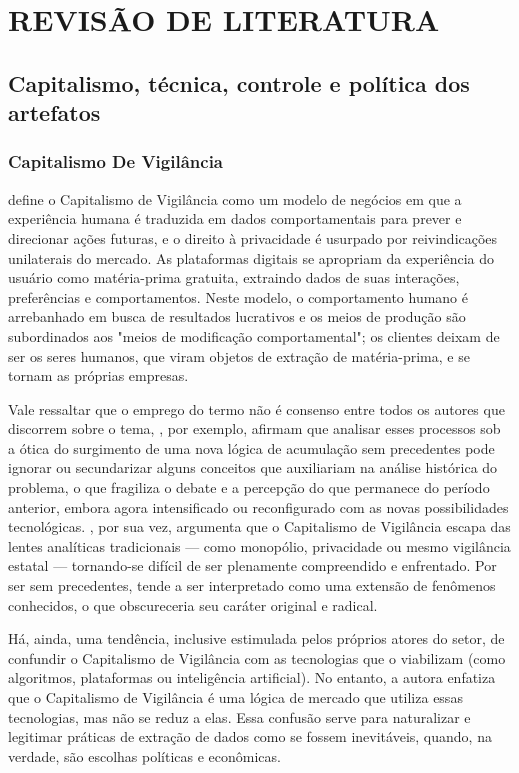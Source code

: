 \chapter{REVISÃO DE LITERATURA}
\label{chap:revisaodeliteratura} 

\section{Capitalismo, técnica, controle e política dos artefatos}
\label{sec:capitalismo-tecnica-controle}

\subsection{Capitalismo De Vigilância}
\label{subsec:capVigilancia}

 define o Capitalismo de Vigilância como um modelo de negócios em que a experiência humana é traduzida em dados comportamentais para prever e direcionar ações futuras, e o direito à privacidade é usurpado por reivindicações unilaterais do mercado. As plataformas digitais se apropriam da experiência do usuário como matéria-prima gratuita, extraindo dados de suas interações, preferências e comportamentos. Neste modelo, o comportamento humano é arrebanhado em busca de resultados lucrativos e os meios de produção são subordinados aos "meios de modificação comportamental"; os clientes deixam de ser os seres humanos, que viram objetos de extração de matéria-prima, e se tornam as próprias empresas.

Vale ressaltar que o emprego do termo não é consenso entre todos os autores que discorrem sobre o tema, , por exemplo, afirmam que analisar esses processos sob a ótica do surgimento de uma nova lógica de acumulação sem precedentes pode ignorar ou secundarizar alguns conceitos que auxiliariam na análise histórica do problema, o que fragiliza o debate e a percepção do que permanece do período anterior, embora agora intensificado ou reconfigurado com as novas possibilidades tecnológicas. , por sua vez, argumenta que o Capitalismo de Vigilância escapa das lentes analíticas tradicionais — como monopólio, privacidade ou mesmo vigilância estatal — tornando-se difícil de ser plenamente compreendido e enfrentado. Por ser sem precedentes, tende a ser interpretado como uma extensão de fenômenos conhecidos, o que obscureceria seu caráter original e radical.

Há, ainda, uma tendência, inclusive estimulada pelos próprios atores do setor, de confundir o Capitalismo de Vigilância com as tecnologias que o viabilizam (como algoritmos, plataformas ou inteligência artificial). No entanto, a autora enfatiza que o Capitalismo de Vigilância é uma lógica de mercado que utiliza essas tecnologias, mas não se reduz a elas. Essa confusão serve para naturalizar e legitimar práticas de extração de dados como se fossem inevitáveis, quando, na verdade, são escolhas políticas e econômicas.

